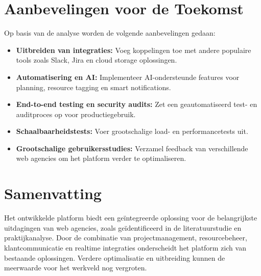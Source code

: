 \section{Aanbevelingen voor de Toekomst}
\label{sec:aanbevelingen}

Op basis van de analyse worden de volgende aanbevelingen gedaan:
\begin{itemize}
    \item \textbf{Uitbreiden van integraties:} Voeg koppelingen toe met andere populaire tools zoals Slack, Jira en cloud storage oplossingen.
    \item \textbf{Automatisering en AI:} Implementeer AI-ondersteunde features voor planning, resource tagging en smart notifications.
    \item \textbf{End-to-end testing en security audits:} Zet een geautomatiseerd test- en auditproces op voor productiegebruik.
    \item \textbf{Schaalbaarheidstests:} Voer grootschalige load- en performancetests uit.
    \item \textbf{Grootschalige gebruikersstudies:} Verzamel feedback van verschillende web agencies om het platform verder te optimaliseren.
\end{itemize}

\section{Samenvatting}
\label{sec:samenvatting}

Het ontwikkelde platform biedt een geïntegreerde oplossing voor de belangrijkste uitdagingen van web agencies, zoals geïdentificeerd in de literatuurstudie en praktijkanalyse. Door de combinatie van projectmanagement, resourcebeheer, klantcommunicatie en realtime integraties onderscheidt het platform zich van bestaande oplossingen. Verdere optimalisatie en uitbreiding kunnen de meerwaarde voor het werkveld nog vergroten.

